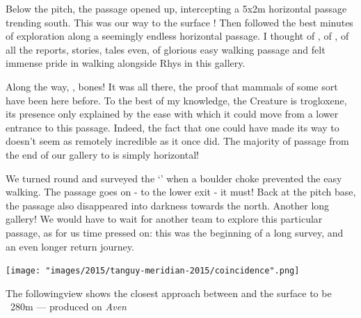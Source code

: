 Below the pitch, the passage opened up, intercepting a 5x2m horizontal passage trending south. This was our way to the surface ! Then followed the best minutes of exploration along a seemingly endless horizontal passage. I thought of , of , of all the reports, stories, tales even, of glorious easy walking passage and felt immense pride in walking alongside Rhys in this gallery.

Along the way, , bones! It was all there, the proof that mammals of some sort have been here before. To the best of my knowledge, the Creature is trogloxene, its presence only explained by the ease with which it could move from a lower entrance to this passage. Indeed, the fact that one could have made its way to  doesn't seem as remotely incredible as it once did. The majority of passage from the end of our gallery to  is simply horizontal!

We turned round and surveyed the `' when a boulder choke prevented the easy walking. The passage goes on - to the lower exit - it must! Back at the pitch base, the passage also disappeared into darkness towards the north. Another long gallery! We would have to wait for another team to explore this particular passage, as for us time pressed on: this was the beginning of a long survey, and an even longer return journey.


\begin{pagesurvey}
\texttt{[image: "images/2015/tanguy-meridian-2015/coincidence".png]}
\caption{The followingview shows the closest approach between \protect{} and the surface to be ~280m --- produced on \emph{Aven}}
\end{pagesurvey}
